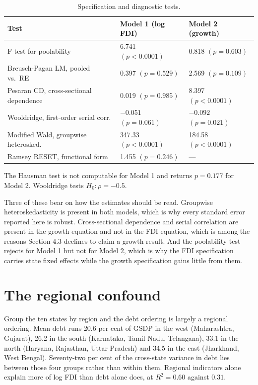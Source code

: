 \documentclass[12pt]{article}
\newcommand{\tnote}[1]{%
  \par\addvspace{4pt}%
  \begin{minipage}{0.92\textwidth}\footnotesize\raggedright #1\end{minipage}}
\begin{document}
\begin{table}[H]
\centering
\caption{Specification and diagnostic tests.}
\label{tab:diag}
\small
\begin{tabular}{@{}lll@{}}
\toprule
Test & Model 1 (log FDI) & Model 2 (growth) \\
\midrule
F-test for poolability                   & 6.741 $(p<0.0001)$ & 0.818 $(p=0.603)$ \\
Breusch-Pagan LM, pooled vs.\ RE         & 0.397 $(p=0.529)$  & 2.569 $(p=0.109)$ \\
Pesaran CD, cross-sectional dependence   & 0.019 $(p=0.985)$  & 8.397 $(p<0.0001)$ \\
Wooldridge, first-order serial corr.     & $-0.051$ $(p=0.061)$ & $-0.092$ $(p=0.021)$ \\
Modified Wald, groupwise heterosked.     & 347.33 $(p<0.0001)$ & 184.58 $(p<0.0001)$ \\
Ramsey RESET, functional form            & 1.455 $(p=0.246)$  & --- \\
\bottomrule
\end{tabular}
\tnote{The Hausman test is not computable for Model 1 and returns $p=0.177$ for
Model 2. Wooldridge tests $H_0: \rho = -0.5$.}
\end{table}

Three of these bear on how the estimates should be read. Groupwise
heteroskedasticity is present in both models, which is why every standard error
reported here is robust. Cross-sectional dependence and serial correlation are
present in the growth equation and not in the FDI equation, which is among the
reasons Section 4.3 declines to claim a growth result. And the poolability test
rejects for Model 1 but not for Model 2, which is why the FDI specification
carries state fixed effects while the growth specification gains little from
them.

\section{The regional confound}

Group the ten states by region and the debt ordering is largely a regional
ordering. Mean debt runs 20.6 per cent of GSDP in the west (Maharashtra,
Gujarat), 26.2 in the south (Karnataka, Tamil Nadu, Telangana), 33.1 in the north
(Haryana, Rajasthan, Uttar Pradesh) and 34.5 in the east (Jharkhand, West
Bengal). Seventy-two per cent of the cross-state variance in debt lies between
those four groups rather than within them. Regional indicators alone explain more
of log FDI than debt alone does, at $R^2 = 0.60$ against $0.31$.
\end{document}
